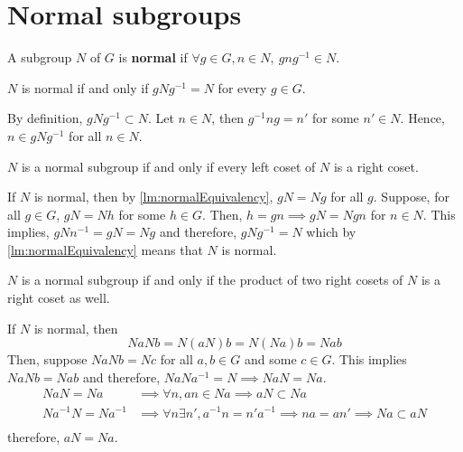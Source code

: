 \section{Normal subgroups}
\begin{definition}
    A subgroup \(N\) of \(G\) is \textbf{normal} if \(\forall g \in G,n \in N,\ gng^{-1} \in N\).
\end{definition}

\begin{lemma}\label{lm:normalEquivalency}
    \(N\) is normal if and only if \(gNg^{-1} = N\) for every \(g \in G\).
\end{lemma}

\begin{prooflemma}
    By definition, \(gNg^{-1} \subset N\). Let \(n \in N\), then \(g^{-1}ng = n'\) for some \(n' \in N\). Hence, \(n \in gNg^{-1}\) for all \(n \in N\).
\end{prooflemma}

\begin{lemma}
    \(N\) is a normal subgroup if and only if every left coset of \(N\) is a right coset.
\end{lemma}

\begin{prooflemma}
    If \(N\) is normal, then by \ref{lm:normalEquivalency}, \(gN = Ng\) for all \(g\). Suppose, for all \(g \in G\), \(gN = Nh\) for some \(h \in G\). Then, \(h = gn \implies gN = Ngn\) for \(n \in N\). This implies, \(gNn^{-1} = gN = Ng\) and therefore, \(gNg^{-1} = N\) which by \ref{lm:normalEquivalency} means that \(N\) is normal.
\end{prooflemma}

\begin{lemma}
    \(N\) is a normal subgroup if and only if the product of two right cosets of \(N\) is a right coset as well.
\end{lemma}

\begin{prooflemma}
    If \(N\) is normal, then 
    \begin{equation*}
        Na Nb = N (aN)b = N (Na)b = Nab
    \end{equation*}
    Then, suppose \(NaNb = Nc\) for all \(a,b \in G\) and some \(c \in G\). This implies \(NaNb = Nab\) and therefore, \(NaNa^{-1} = N \implies NaN = Na\).
    \begin{align*}
        NaN = Na &\implies \forall n, an \in Na \implies  aN \subset Na\\
        Na^{-1}N = Na^{-1} &\implies \forall n \exists n', a^{-1}n = n'a^{-1} \implies na = an' \implies Na \subset aN \\
    \end{align*}
    therefore, \(aN = Na\).
\end{prooflemma}

